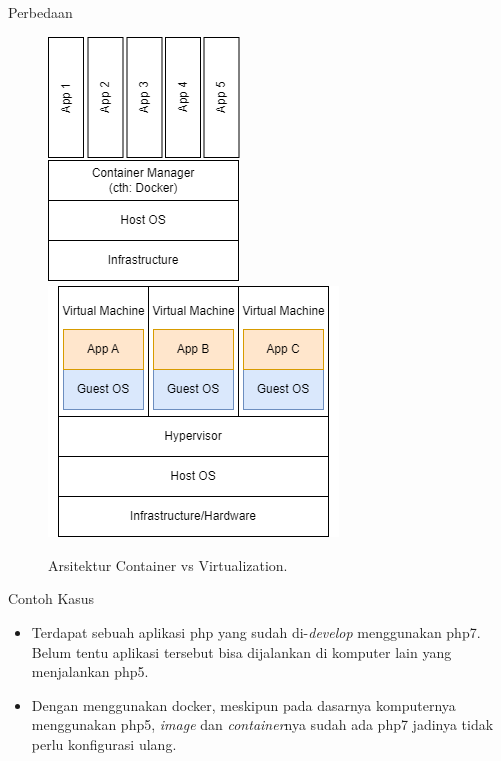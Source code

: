 \documentclass[aspectratio=169, table]{beamer}
\begin{document}
	\begin{frame}{Perbedaan}
		\begin{figure}[h]
			\centering
			\includegraphics[width=.20\textwidth]{ContainerDiagram.png}
			\includegraphics[width=.25\textwidth]{VirtualizationDiagram.png}
			\caption{Arsitektur Container vs Virtualization.}
			\label{fig:ContainerDiagram}
		\end{figure}
	\end{frame}

	\begin{frame}{Contoh Kasus}
		\begin{itemize}
			\item Terdapat sebuah aplikasi php yang sudah di-\textit{develop} menggunakan php7. Belum tentu aplikasi tersebut bisa dijalankan di komputer lain yang menjalankan php5.
			\item Dengan menggunakan docker, meskipun pada dasarnya komputernya menggunakan php5, \textit{image} dan \textit{container}nya sudah ada php7 jadinya tidak perlu konfigurasi ulang.
		\end{itemize}
	\end{frame}
\end{document}
